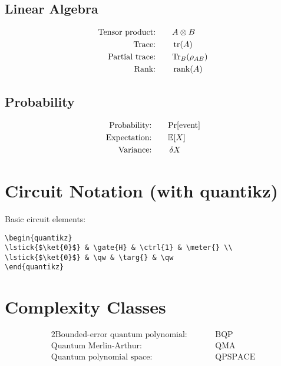 \documentclass[12pt]{article}
\newcommand{\tensor}{\otimes}
\newcommand{\ptr}[1]{\text{Tr}_{#1}}
\newcommand{\BQP}{\text{BQP}}
\newcommand{\QMA}{\text{QMA}}
\newcommand{\QPSPACE}{\text{QPSPACE}}
\newcommand{\prob}[1]{\text{Pr}[#1]}
\newcommand{\expect}[1]{\mathbb{E}[#1]}
\theoremstyle{definition}
\theoremstyle{remark}
\begin{document}
\subsection{Linear Algebra}
\begin{alignat}{2}
\text{Tensor product:}  &\quad && A \tensor B \\
\text{Trace:}           &\quad && \tr(A) \\
\text{Partial trace:}   &\quad && \ptr{B}(\rho_{AB}) \\
\text{Rank:}            &\quad && \rank(A)
\end{alignat}

\subsection{Probability}
\begin{alignat}{2}
\text{Probability:}  &\quad && \prob{\text{event}} \\
\text{Expectation:}  &\quad && \expect{X} \\
\text{Variance:}     &\quad && \var{X}
\end{alignat}

\section{Circuit Notation (with quantikz)}

Basic circuit elements:
\begin{verbatim}
\begin{quantikz}
\lstick{$\ket{0}$} & \gate{H} & \ctrl{1} & \meter{} \\
\lstick{$\ket{0}$} & \qw & \targ{} & \qw
\end{quantikz}
\end{verbatim}

\section{Complexity Classes}

\begin{alignat}{2}
\text{Bounded-error quantum polynomial:} &\quad && \BQP \\
\text{Quantum Merlin-Arthur:}           &\quad && \QMA \\
\text{Quantum polynomial space:}        &\quad && \QPSPACE
\end{alignat}


\end{document}

